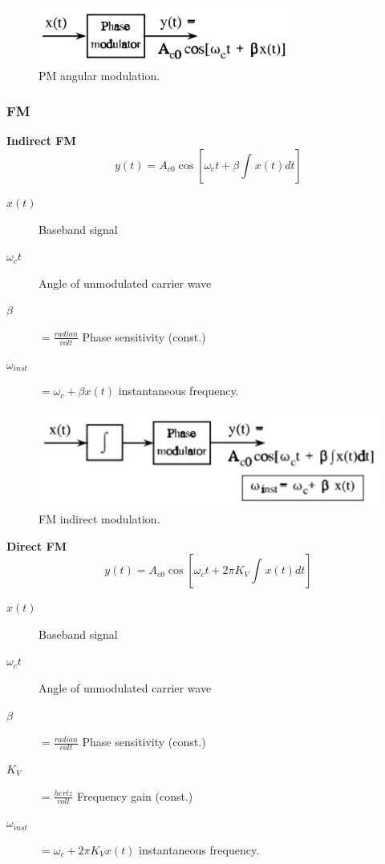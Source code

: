 \begin{figure} [H]
	\centering
	\includegraphics[width=0.5\linewidth]{graphics/10.png}
	\caption{PM angular modulation.}
	\label{fig:10}
\end{figure}

\subsubsection{FM}
\textbf{Indirect FM}
\begin{equation}\label{eq:FM1}
y(t) =A_{c0}\cos[\omega_c t + \beta \int_{}^{} x(t) dt]
\end{equation}

\begin{description}
	\item[$x(t)$] Baseband signal
	\item[$\omega_c t$] Angle of unmodulated carrier wave
	\item[$\beta$]$=\frac{radian}{volt}$ Phase sensitivity (const.)
	\item[$\omega_{inst}$] $=\omega_c + \beta x(t)$ instantaneous frequency.
\end{description}

\begin{figure} [H]
	\centering
	\includegraphics[width=0.65\linewidth]{graphics/11.png}
	\caption{FM indirect modulation.}
	\label{fig:11}
\end{figure}



\noindent\textbf{Direct FM}
\begin{equation}\label{eq:FM2}
y(t) =A_{c0} \cos[\omega_c t +2\pi K_V\int_{}^{} x(t) dt]
\end{equation}

\begin{description}
	\item[$x(t)$] Baseband signal
	\item[$\omega_c t$] Angle of unmodulated carrier wave
	\item[$\beta$]$=\frac{radian}{volt}$ Phase sensitivity (const.)
	\item[$K_V$]$=\frac{hertz}{volt}$ Frequency gain (const.)
	\item[$\omega_{inst}$] $=\omega_c + 2\pi K_V x(t)$ instantaneous frequency.
\end{description}

